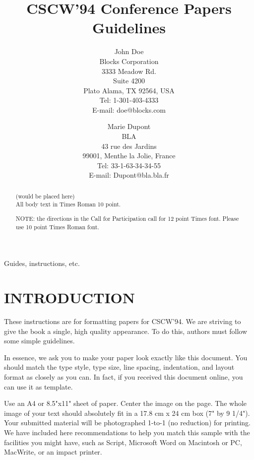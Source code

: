 %



\title{CSCW'94 Conference Papers Guidelines}
\author{{\authorfont John Doe}  \\ 
Blocks Corporation \\
3333 Meadow Rd. \\
Suite 4200 \\
Plato Alama, TX 92564, USA \\
Tel: 1-301-403-4333 \\
E-mail: doe@blocks.com 
\and
{\authorfont Marie Dupont} \\
BLA \\
43 rue des Jardins \\
99001, Menthe la Jolie, France \\
Tel: 33-1-63-34-34-55 \\
E-mail: Dupont@bla.bla.fr
}
\date{}
\maketitle

\begin{abstract}
(would be placed here)	\\
All body text in Times Roman 10 point.

NOTE: the directions in the Call for Participation call for 12 point
Times font.  Please use 10 point Times Roman font.
\end{abstract}
\copyrightspace
\keywords Guides, instructions, etc.

\section{INTRODUCTION}
These instructions are for formatting papers for CSCW'94.  We are
striving to give the book a single, high quality appearance.
To do this, authors must follow some simple guidelines.

In essence, we ask you to make your paper look exactly like this document.
You should match the type style, type size, line spacing, indentation,
and layout format as closely as you can.  In fact, if you received this
document online, you can use it as template.

Use an A4 or 8.5"x11" sheet of paper. Center the image on the page.
The whole image of your text should absolutely fit in a 17.8 cm x 24
cm box (7" by 9 1/4"). Your submitted material will be
photographed 1-to-1 (no reduction) for printing. We have included
here recommendations to help you match this sample with the
facilities you might have, such as Script, Microsoft Word on
Macintosh or PC, MacWrite, or an impact printer.

